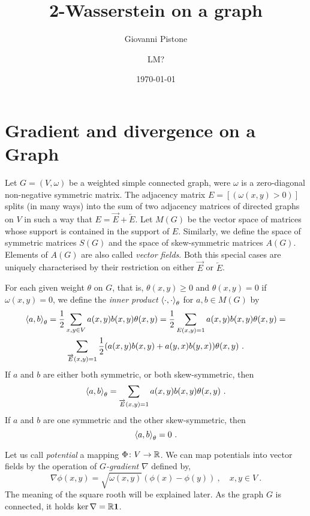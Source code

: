 \documentclass[12pt,a4paper]{amsart}
\title{2-Wasserstein on a graph}
\author{Giovanni Pistone}
\author{LM?}
\date{\today}
\begin{document}
\maketitle

\section{Gradient and divergence on a Graph}

Let $G = (V,\omega)$ be a weighted simple connected graph, were
$\omega$ is a zero-diagonal non-negative symmetric matrix. The
adjacency matrix $E = [(\omega(x,y) > 0)]$ splits (in many ways) into
the sum of two adjacency matrices of directed graphs on $V$ in such a
way that $E = \overrightarrow E + \overleftarrow E$. Let $M(G)$ be the
vector space of matrices whose support is contained in the support of
$E$. Similarly, we define the space of symmetric matrices $S(G)$ and
the space of skew-symmetric matrices $A(G)$. Elements of $A(G)$ are
also called \emph{vector fields}. Both this special cases are uniquely
characterised by their restriction on either $\overrightarrow E$ or
$\overleftarrow E$.

For each given weight $\theta$ on $G$, that is, $\theta(x,y) \geq 0$
and $\theta(x,y) = 0$ if $\omega(x,y) = 0$, we define the \emph{inner
  product} $\left\langle\cdot,\cdot\right\rangle_{\theta}$ for $a,b \in M(G)$ by
\begin{multline*}
  \left\langle a,b\right\rangle_{\theta} = \frac 12 \sum _ {x,y \in V} a(x,y)
  b(x,y)\theta(x,y) = \frac 12 \sum _ {E(x,y)=1} a(x,y)
  b(x,y)\theta(x,y) = \\ \sum_{\overrightarrow E(x,y)=1}
  \frac12(a(x,y)b(x,y)+a(y,x)b(y,x)) \theta(x,y)\ .
\end{multline*}
If $a$ and $b$ are either both symmetric, or both skew-symmetric, then
\begin{equation*}
  \left\langle a,b\right\rangle_{\theta} = \sum_{\overrightarrow E(x,y)=1}
  a(x,y)b(x,y) \theta(x,y) \ .
\end{equation*}
If $a$ and $b$ are one symmetric and the other skew-symmetric, then
\begin{equation*}
  \left\langle a,b\right\rangle_{\theta} = 0 \ .
\end{equation*}

Let us call \emph{potential} a mapping $\Phi \colon V \to \mathbb{R}$. We
can map potentials into vector fields by the operation of
\emph{$G$-gradient} $\nabla$ defined by,
\begin{equation*}
  \nabla \phi(x,y) = \sqrt {\omega(x,y)} (\phi(x) - \phi(y)) \ , \quad
  x,y \in V \ .
\end{equation*}
The meaning of the square rooth will be explained later. As the graph
$G$ is connected, it holds $\ker \nabla = \mathbb{R} \bm 1$.
\end{document}
